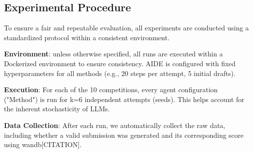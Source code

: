 



\subsection{Experimental Procedure}

To ensure a fair and repeatable evaluation, all experiments are conducted using a standardized protocol within a consistent environment.

\textbf{Environment}: unless otherwise specified, all runs are executed within a Dockerized environment to ensure consistency. AIDE is configured with fixed hyperparameters for all methods (e.g., 20 steps per attempt, 5 initial drafts).

\textbf{Execution}: For each of the 10 competitions, every agent configuration ("Method") is run for k=6 independent attempts (seeds). This helps account for the inherent stochasticity of LLMs.

\textbf{Data Collection}: After each run, we automatically collect the raw data, including whether a valid submission was generated and its corresponding score using wandb[CITATION].

